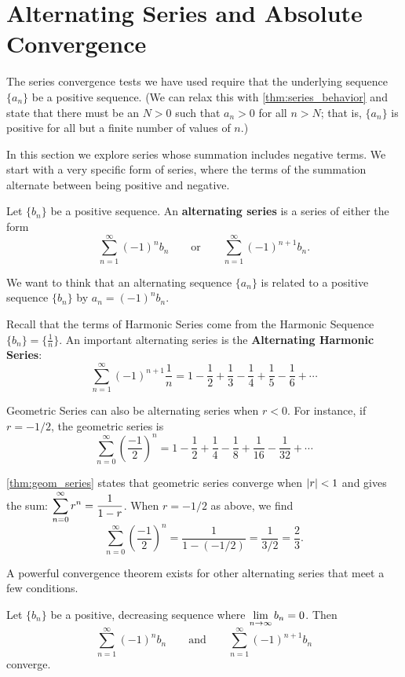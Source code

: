 \section{Alternating Series and Absolute Convergence}\label{sec:alt_series}

The series convergence tests we have used require that the underlying sequence $\{a_n\}$ be a positive sequence. (We can relax this with \autoref{thm:series_behavior} and state that there must be an $N>0$ such that $a_n>0$ for all $n>N$; that is, $\{a_n\}$ is positive for all but a finite number of values of $n$.)

In this section we explore series whose summation includes negative terms. We start with a very specific form of series, where the terms of the summation alternate between being positive and negative.

\begin{definition}\label{def:alt_series}%
Let $\{b_n\}$ be a positive sequence. An \textbf{alternating series} is a series of either the form
\[
\sum_{n=1}^\infty (-1)^nb_n\qquad \text{or}\qquad \sum_{n=1}^\infty (-1)^{n+1}b_n.
\]
\end{definition}

We want to think that an alternating sequence $\{a_n\}$ is related to a positive sequence $\{b_n\}$ by $a_n=(-1)^n b_n$.

Recall that the terms of Harmonic Series come from the Harmonic Sequence $\{b_n\} = \{\frac1n\}$. An important alternating series is the \textbf{Alternating Harmonic Series}:
\[
\sum_{n=1}^\infty (-1)^{n+1}\frac1n
= 1-\frac12+\frac13-\frac14+\frac15-\frac16+\dotsb
\]

Geometric Series can also be alternating series when $r<0$. For instance, if $r=-1/2$, the geometric series is
\[
\sum_{n=0}^\infty \left(\frac{-1}{2}\right)^n
= 1-\frac12+\frac14-\frac18+\frac1{16}-\frac1{32}+\dotsb
\]

\autoref{thm:geom_series} states that geometric series converge when $\left\lvert r \right\rvert<1$ and gives the sum: $\displaystyle \sum_{n=0}^\infty r^n = \frac1{1-r}$. When $r=-1/2$ as above, we find
\[
\sum_{n=0}^\infty\left(\frac{-1}{2}\right)^n=\frac1{1-(-1/2)}=\frac 1{3/2}=\frac23.
\]

A powerful convergence theorem exists for other alternating series that meet a few conditions.

\begin{theorem}\label{thm:alt_series_test}%
Let $\{b_n\}$ be a positive, decreasing sequence where $\displaystyle\lim_{n\to\infty}b_n=0$. Then
\[
\sum_{n=1}^\infty (-1)^{n}b_n \qquad \text{and}\qquad \sum_{n=1}^\infty (-1)^{n+1}b_n
\]
converge.
\end{theorem}

